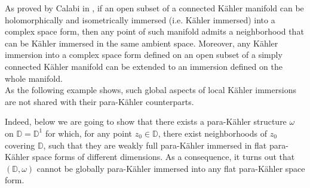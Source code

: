 \documentclass{article}
\newcommand{\pk}{para-K\"ahler }
\newcommand{\D}{\mathds{D}}
\begin{document}
As proved by Calabi in \cite{Cal}, if an open subset of a connected K\"ahler manifold can be holomorphically  and isometrically immersed (i.e.  K\"ahler immersed) into a complex space form, then any point of such manifold admits a neighborhood that can be K\"ahler immersed in the same ambient space. Moreover, any  K\"ahler immersion into a complex space form defined on an open subset of  a  simply connected K\"ahler manifold can be extended to an immersion defined on the whole manifold.\\
As the following example shows, such global aspects of local K\"ahler  immersions are not shared with their \pk counterparts.

\smallskip

Indeed, below we are going to show that there exists a \pk structure $\omega$ on $\D=\D^1$ for which, for any point $z_0\in\D$, there exist neighborhoods of $z_0$  covering $\D$, such that they are weakly full \pk immersed in flat \pk space forms of different dimensions. As a consequence, it turns out that $(\D,\omega)$ cannot be globally \pk immersed into any flat \pk space form.

\smallskip
\end{document}
